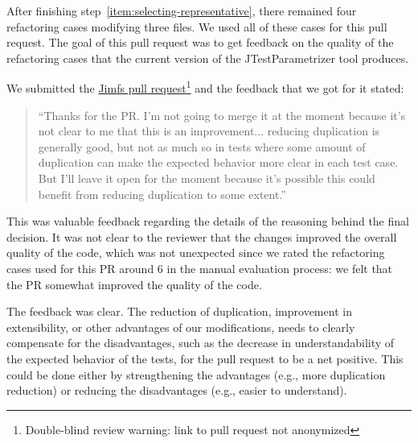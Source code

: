 After finishing step~\ref{item:selecting-representative}, there remained four refactoring cases modifying three files. We used all of these cases for this pull request. The goal of this pull request was to get feedback on the quality of the refactoring cases that the current version of the JTestParametrizer tool produces.

We submitted the \href{https://github.com/google/jimfs/pull/159}{Jimfs pull request}\footnote{Double-blind review warning: link to pull request not anonymized} and the feedback that we got for it stated: \begin{quote}``Thanks for the PR. I'm not going to merge it at the moment because it's not clear to me that this is an improvement... reducing duplication is generally good, but not as much so in tests where some amount of duplication can make the expected behavior more clear in each test case. But I'll leave it open for the moment because it's possible this could benefit from reducing duplication to some extent.''\end{quote}

This was valuable feedback regarding the details of the reasoning behind the final decision. It was not clear to the reviewer that the changes improved the overall quality of the code, which was not unexpected since we rated the refactoring cases used for this PR around 6 in the manual evaluation process: we felt that the PR somewhat improved the quality of the code. 

The feedback was clear. The reduction of duplication, improvement in extensibility, or other advantages of our modifications, needs to clearly compensate for the disadvantages, such as the decrease in understandability of the expected behavior of the tests, for the pull request to be a net positive. This could be done either by strengthening the advantages (e.g., more duplication reduction) or reducing the disadvantages (e.g., easier to understand).



